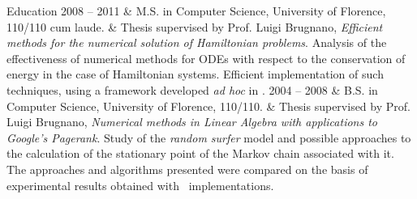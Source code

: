 \documentclass[10pt]{article}
\begin{document}
\begin{cvsection}{Education}
2008 -- 2011 & M.S. in Computer Science, University of Florence, 110/110 cum laude.\spacednewline
	& Thesis supervised by Prof. Luigi Brugnano, \emph{Efficient methods for the numerical solution of Hamiltonian problems}.
	Analysis of the effectiveness of numerical methods for ODEs with respect to the conservation of energy in the case of Hamiltonian systems. Efficient implementation of such techniques, using a framework developed \emph{ad hoc} in .\spacednewline
2004 -- 2008 & B.S. in Computer Science, University of Florence, 110/110.\spacednewline
	& Thesis supervised by Prof. Luigi Brugnano, \emph{Numerical methods in Linear Algebra with applications to Google's Pagerank}. Study of the \emph{random surfer} model and possible approaches to the calculation of the stationary point of the Markov chain associated with it. The approaches and algorithms presented were compared on the basis of experimental results obtained with \ implementations.
\end{cvsection}
\end{document}
